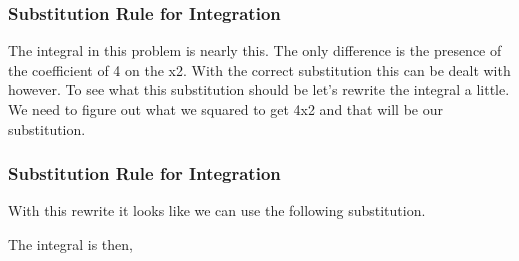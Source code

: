 \documentclass{beamer}
\begin{document}
 \begin{frame}
 	\frametitle{Substitution Rule for Integration}
 	\large 
The integral in this problem is nearly this.  The only difference is the presence of the coefficient of 4 on the x2.  With the correct substitution this can be dealt with however.  To see what this substitution should be let’s rewrite the integral a little.  We need to figure out what we squared to get 4x2 and that will be our substitution.
 
                                               
 \end{frame}
 \begin{frame}
 	\frametitle{Substitution Rule for Integration}
 	\large 
With this rewrite it looks like we can use the following substitution.
                                
 
The integral is then,
                                              
\end{frame}
\end{document}
